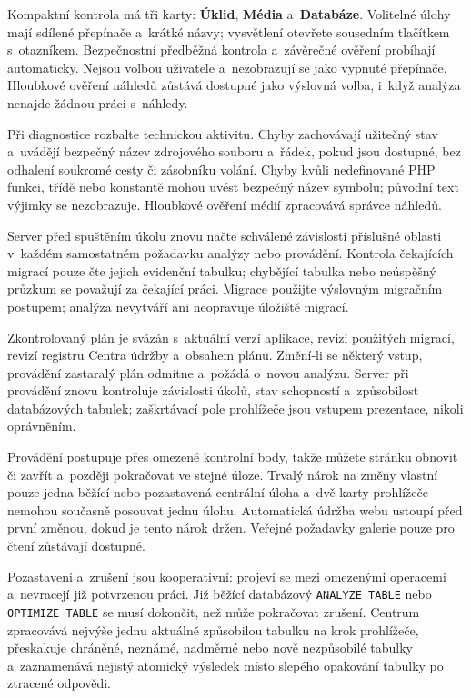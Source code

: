 \documentclass[11pt,a4paper]{article}
\newcommand{\ui}[1]{\textbf{#1}}
\newcommand{\codeword}[1]{\nolinkurl{#1}}
\begin{document}
Kompaktní kontrola má tři karty: \ui{Úklid}, \ui{Média} a~\ui{Databáze}.
Volitelné úlohy
mají sdílené přepínače a~krátké názvy; vysvětlení otevřete sousedním tlačítkem
s~otazníkem. Bezpečnostní předběžná kontrola a~závěrečné ověření probíhají
automaticky. Nejsou volbou uživatele a~nezobrazují se jako vypnuté přepínače.
Hloubkové ověření náhledů zůstává dostupné jako výslovná volba, i~když analýza
nenajde žádnou práci s~náhledy.

Při diagnostice rozbalte technickou aktivitu. Chyby zachovávají užitečný stav
a~uvádějí bezpečný název zdrojového souboru a~řádek, pokud jsou dostupné, bez
odhalení soukromé cesty či zásobníku volání. Chyby kvůli nedefinované PHP
funkci, třídě nebo konstantě mohou uvést bezpečný název symbolu; původní text
výjimky se nezobrazuje. Hloubkové ověření médií zpracovává správce náhledů.

Server před spuštěním úkolu znovu načte schválené závislosti příslušné oblasti
v~každém samostatném požadavku analýzy nebo provádění. Kontrola čekajících
migrací pouze čte jejich evidenční tabulku; chybějící tabulka nebo neúspěšný
průzkum se považují za čekající práci. Migrace použijte výslovným migračním
postupem; analýza nevytváří ani neopravuje úložiště migrací.

Zkontrolovaný plán je svázán s~aktuální verzí aplikace, revizí použitých
migrací, revizí registru Centra údržby a~obsahem plánu. Změní-li se některý
vstup, provádění zastaralý plán odmítne a~požádá o~novou analýzu. Server při
provádění znovu kontroluje závislosti úkolů, stav schopností a~způsobilost
databázových tabulek; zaškrtávací pole prohlížeče jsou vstupem prezentace,
nikoli oprávněním.

Provádění postupuje přes omezené kontrolní body, takže můžete stránku obnovit či
zavřít a~později pokračovat ve stejné úloze. Trvalý nárok na změny vlastní pouze
jedna běžící nebo pozastavená centrální úloha a~dvě karty prohlížeče nemohou
současně posouvat jednu úlohu. Automatická údržba webu ustoupí před první
změnou, dokud je tento nárok držen. Veřejné požadavky galerie pouze pro čtení
zůstávají dostupné.

Pozastavení a~zrušení jsou kooperativní: projeví se mezi omezenými operacemi
a~nevracejí již potvrzenou práci. Již běžící databázový \codeword{ANALYZE TABLE}
nebo \codeword{OPTIMIZE TABLE} se musí dokončit, než může pokračovat zrušení.
Centrum zpracovává nejvýše jednu aktuálně způsobilou tabulku na krok prohlížeče,
přeskakuje chráněné, neznámé, nadměrné nebo nově nezpůsobilé tabulky
a~zaznamenává nejistý atomický výsledek místo slepého opakování tabulky po
ztracené odpovědi.
\end{document}
